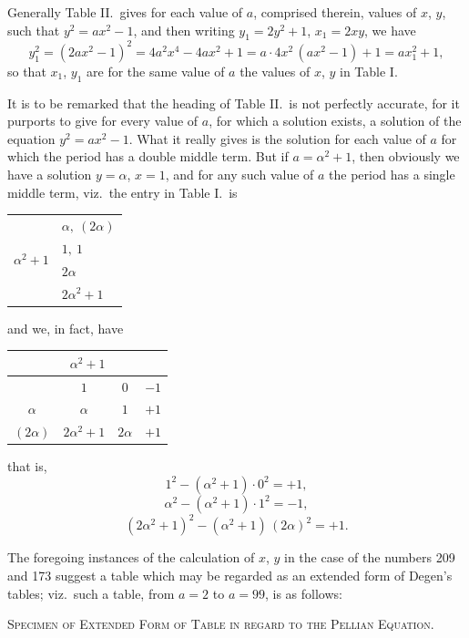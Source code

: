 \documentclass[11pt]{article}
\begin{document}
Generally Table II.\ gives for each value of $a$, comprised therein, values of $x$, $y$, such that $y^2 = ax^2 - 1$, and then writing $y_1 = 2y^2 + 1$, $x_1 = 2xy$, we have
\[
y_1^2 = (2ax^2 - 1)^2 = 4a^2 x^4 - 4ax^2 + 1 = a \cdot 4x^2\,(ax^2 - 1) + 1 = a x_1^2 + 1,
\]
so that $x_1$, $y_1$ are for the same value of $a$ the values of $x$, $y$ in Table I.

It is to be remarked that the heading of Table II.\ is not perfectly accurate, for it purports to give for every value of $a$, for which a solution exists, a solution of the equation $y^2 = ax^2 - 1$. What it really gives is the solution for each value of $a$ for which the period has a double middle term. But if $a = \alpha^2 + 1$, then obviously we have a solution $y = \alpha$, $x = 1$, and for any such value of $a$ the period has a single middle term, viz.\ the entry in Table I.\ is
\begin{center}
\begin{tabular}{c|l}
\multirow{4}{*}{$\alpha^2 + 1$} & $\alpha,\ (2\alpha)$ \\
 & $1,\ 1$ \\
 & $2\alpha$ \\
 & $2\alpha^2 + 1$ \\
\end{tabular}
\end{center}
and we, in fact, have
\begin{center}
\begin{tabular}{|c|c|c|c|}
\hline
\multicolumn{4}{|c|}{$\alpha^2 + 1$} \\
\hline
 & $1$ & $0$ & $- 1$ \\
$\alpha$ & $\alpha$ & $1$ & $+ 1$ \\
$(2\alpha)$ & $2\alpha^2 + 1$ & $2\alpha$ & $+ 1$ \\
\hline
\end{tabular}
\end{center}
that is,
\[
1^2 - (\alpha^2 + 1) \cdot 0^2 = + 1,
\]
\[
\alpha^2 - (\alpha^2 + 1) \cdot 1^2 = - 1,
\]
\[
(2\alpha^2 + 1)^2 - (\alpha^2 + 1)\,(2\alpha)^2 = + 1.
\]

The foregoing instances of the calculation of $x$, $y$ in the case of the numbers 209 and 173 suggest a table which may be regarded as an extended form of Degen's tables; viz.\ such a table, from $a = 2$ to $a = 99$, is as follows:

\begin{center}
\small\textsc{Specimen of Extended Form of Table in regard to the Pellian Equation.}
\end{center}
\end{document}
